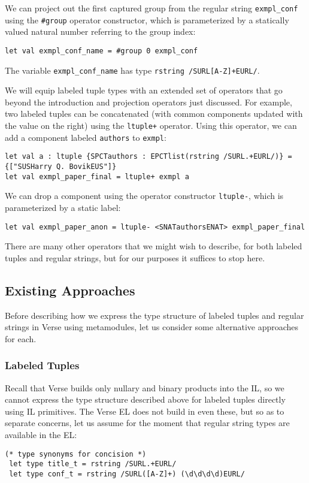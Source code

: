 We can project out the first captured group from the regular string \lstinline{exmpl_conf} using the \lstinline{#group} operator constructor, which is parameterized by a statically valued natural number referring to the group index:
\begin{lstlisting}[numbers=none]
let val exmpl_conf_name = #group 0 exmpl_conf
\end{lstlisting}
The variable \lstinline{exmpl_conf_name} has type \lstinline{rstring /SURL[A-Z]+EURL/}.

We will equip labeled tuple types with an extended set of operators that go beyond the introduction and projection operators just discussed. For example, two labeled tuples can be concatenated (with common components updated with the value on the right) using the \lstinline{ltuple+} operator. Using this operator, we can add a component labeled \lstinline{authors} to \lstinline{exmpl}:
\begin{lstlisting}[numbers=none]
let val a : ltuple {SPCTauthors : EPCTlist(rstring /SURL.+EURL/)} = {["SUSHarry Q. BovikEUS"]}
let val exmpl_paper_final = ltuple+ exmpl a
\end{lstlisting}
We can drop a component using the operator constructor \lstinline{ltuple-}, which is parameterized by a static label:
\begin{lstlisting}[numbers=none]
let val exmpl_paper_anon = ltuple- <SNATauthorsENAT> exmpl_paper_final
\end{lstlisting}
There are many other operators that we might wish to describe, for both labeled tuples and regular strings, but for our purposes it suffices to stop here.

\subsection{Existing Approaches}\label{sec:metamodules-related}
Before describing how we express the type structure of labeled tuples and regular strings in Verse using metamodules, let us consider some alternative approaches for each.

\subsubsection{Labeled Tuples}
Recall that Verse builds only nullary and binary products into the IL, so we cannot express the type structure described above for labeled tuples  directly using IL primitives. The Verse EL does not build in even these, but so as to separate concerns, let us assume for the moment that regular string types are available in the EL: %
\begin{lstlisting}[numbers=none]
 (* type synonyms for concision *)
 let type title_t = rstring /SURL.+EURL/
 let type conf_t = rstring /SURL([A-Z]+) (\d\d\d\d)EURL/
\end{lstlisting}

